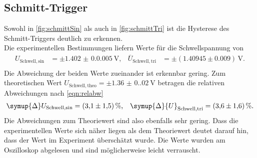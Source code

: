\subsection{Schmitt-Trigger}
Sowohl in \autoref{fig:schmittSin} als auch in \autoref{fig:schmittTri} ist die Hysterese des Schmitt-Triggers deutlich zu erkennen.\\
Die experimentellen Bestimmungen liefern Werte für die Schwellspannung von 
\begin{align*}
    U_{\mathrm{Schwell,sin}} &= \pm\qty{1.402(0.0005)}{\volt}, & \overline{U}_{\mathrm{Schwell,tri}} &= \pm(1.40945\pm0.009)\,\unit{\volt}. \\
\end{align*}
Die Abweichung der beiden Werte zueinander ist erkennbar gering. Zum theoretischen Wert $U_{\mathrm{Schwell,theo}} = \pm\qty{1.36(0.02)}{\volt}$ betragen die relativen Abweichungen nach \autoref{eqn:relabw}
\begin{align*}
    \symup{\Delta}U_{\mathrm{Schwell,sin}} &= \qty{3.1(1.5)}{\%}, & \symup{\Delta}{U}_{\mathrm{Schwell,tri}} &= \qty{3.6(1.6)}{\%}. \\
\end{align*}
Die Abweichungen zum Theoriewert sind also ebenfalls sehr gering. 
Dass die experimentellen Werte sich näher liegen als dem Theoriewert deutet darauf hin, dass der Wert im Experiment überschätzt wurde. 
Die Werte wurden am Oszilloskop abgelesen und sind möglicherweise leicht verrauscht.
